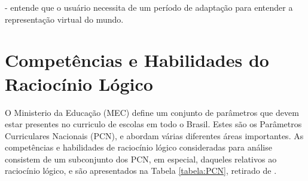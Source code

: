 - entende que o usuário necessita de um período de adaptação para entender a representação virtual do mundo.

\section{Competências e Habilidades do Raciocínio Lógico}\label{sec-competenciashabilidades}

O Ministerio da Educação (MEC) define um conjunto de parâmetros que devem estar presentes no curriculo de escolas em todo o Brasil. Estes são os Parâmetros Curriculares Nacionais (PCN), e abordam várias diferentes áreas importantes. 
As competências e habilidades de raciocínio lógico consideradas para análise consistem de um subconjunto dos PCN, em especial, daqueles relativos ao raciocínio lógico, e são apresentados na Tabela \ref{tabela:PCN}, retirado de \cite{Tabuti:2015:tabela_habilidades}.

